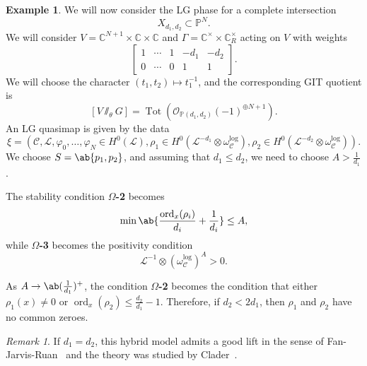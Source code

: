 \documentclass[10pt]{amsart}
\theoremstyle{definition}
\newtheorem{exm}[thm]{Example}
\theoremstyle{remark}
\newtheorem{rmk}[thm]{Remark}
\theoremstyle{plain}
\theoremstyle{definition}
\theoremstyle{remark}
\newcommand{\C}{\mathbb{C}}
\renewcommand{\P}{\mathbb{P}}
\newcommand{\mc}[1]{\mathcal{#1}}
\newcommand{\on}[1]{\operatorname{#1}}
\newcommand{\1}{\mathbf{1}}
\newcommand{\2}{\mathbf{2}}
\newcommand{\3}{\mathbf{3}}
\begin{document}
\begin{exm}
    We will now consider the LG phase for a complete intersection
    \[ X_{d_1, d_2} \subset \P^N. \]
    We will consider $V = \C^{N+1} \times \C \times \C$ and $\Gamma = \C^{\times} \times \C^{\times}_R$ acting on $V$ with weights
    \[ \begin{bmatrix}
        1 & \cdots & 1 & -d_1 & -d_2 \\
        0 & \cdots & 0 & 1 & 1
    \end{bmatrix}. \]
    We will choose the character $(t_1, t_2) \mapsto t_1^{-1}$, and the corresponding GIT quotient is 
    \[ [V \sslash_{\theta} G] = \on{Tot}(\mc{O}_{\P(d_1, d_2)}(-1)^{\oplus N+1}). \] 
    An LG quasimap is given by the data
    \[ \xi = (\mc{C}, \mc{L}, \varphi_0, \ldots, \varphi_N \in H^0(\mc{L}), \rho_1 \in H^0( \mc{L}^{-d_1} \otimes \omega_{\mc{C}}^{\log} ), \rho_2 \in H^0(\mc{L}^{-d_2} \otimes \omega_{\mc{C}}^{\log})). \]
    We choose $S = \ab\{p_1, p_2 \}$, and assuming that $d_1 \leq d_2$, we need to choose $A > \frac{1}{d_1}$.

    The stability condition \textbf{$\Omega$-2} becomes
    \[ \min \ab\{ \frac{\on{ord}_x(\rho_i)}{d_i} + \frac{1}{d_i}\} \leq A, \]
    while \textbf{$\Omega$-3} becomes the positivity condition
    \[ \mc{L}^{-1} \otimes (\omega_{\mc{C}}^{\log})^A > 0. \]

    As $A \to \ab(\frac{1}{d_1})^+$, the condition \textbf{$\Omega$-2} becomes the condition that either $\rho_1(x) \neq 0$ or $\on{ord}_x(\rho_2) \leq \frac{d_2}{d_1} - 1$. Therefore, if $d_2 < 2 d_1$, then $\rho_1$ and $\rho_2$ have no common zeroes.
\end{exm}

\begin{rmk}
    If $d_1 = d_2$, this hybrid model admits a good lift in the sense of Fan-Jarvis-Ruan~\cite{glsm} and the theory was studied by Clader~\cite{clader}.
\end{rmk}
\end{document}
